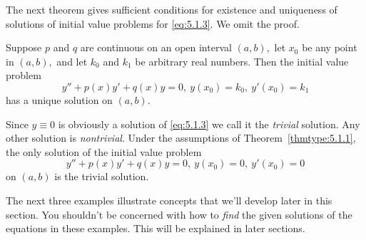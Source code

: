 \documentclass{ximera}
\begin{document}
The next theorem gives sufficient conditions for existence and
uniqueness of solutions of initial value problems for \eqref{eq:5.1.3}. We
omit the proof.

\begin{theorem} \label{thmtype:5.1.1}
Suppose $p$ and $q$ are continuous on an open interval $(a,b),$
let $x_0$ be any point in $(a,b),$ and let $k_0$ and $k_1$ be
arbitrary real numbers. Then the initial value problem
$$
y''+p(x)y'+q(x)y=0,\ y(x_0)=k_0,\ y'(x_0)=k_1
$$
 has a unique solution  on $(a,b)$.
\end{theorem}

Since $y\equiv0$ is obviously a solution of \eqref{eq:5.1.3} we call it
the \textit{trivial} solution. Any other solution is \textit{nontrivial}.
Under the assumptions of Theorem~\ref{thmtype:5.1.1}, the only solution of
the initial value problem
$$
y''+p(x)y'+q(x)y=0,\ y(x_0)=0,\ y'(x_0)=0
$$
on  $(a,b)$ is the trivial solution.

The next three examples illustrate concepts that we'll develop later
in this section. You shouldn't be concerned with how to \textit{find}
the given solutions of the equations in these examples. This will be
explained in later sections.
\end{document}
